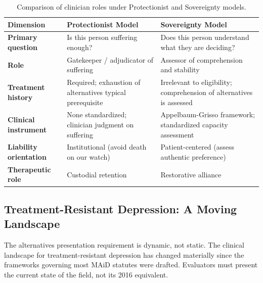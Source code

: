 \documentclass[11pt, letterpaper]{article}
\begin{document}
\begin{table}[h!]
\centering
\small
\renewcommand{\arraystretch}{1.5}
\begin{tabularx}{\textwidth}{>{\sffamily\bfseries\small}p{3.2cm} X X}
\toprule
\rowcolor{C@accent}
{\color{white}\sffamily\bfseries Dimension} &
{\color{white}\sffamily\bfseries Protectionist Model} &
{\color{white}\sffamily\bfseries Sovereignty Model} \\
\midrule
Primary question
  & Is this person suffering enough?
  & Does this person understand what they are deciding? \\
Role
  & Gatekeeper / adjudicator of suffering
  & Assessor of comprehension and stability \\
Treatment history
  & Required; exhaustion of alternatives typical prerequisite
  & Irrelevant to eligibility; comprehension of alternatives is assessed \\
Clinical instrument
  & None standardized; clinician judgment on suffering
  & Appelbaum-Grisso framework; standardized capacity assessment \\
Liability orientation
  & Institutional (avoid death on our watch)
  & Patient-centered (assess authentic preference) \\
Therapeutic role
  & Custodial retention
  & Restorative alliance \\
\bottomrule
\end{tabularx}
\caption{Comparison of clinician roles under Protectionist and Sovereignty models.}
\end{table}

\subsection{Treatment-Resistant Depression: A Moving Landscape}

The alternatives presentation requirement is dynamic, not static. The clinical landscape
for treatment-resistant depression has changed materially since the frameworks governing
most MAiD statutes were drafted. Evaluators must present the current state of the field,
not its 2016 equivalent.
\end{document}
